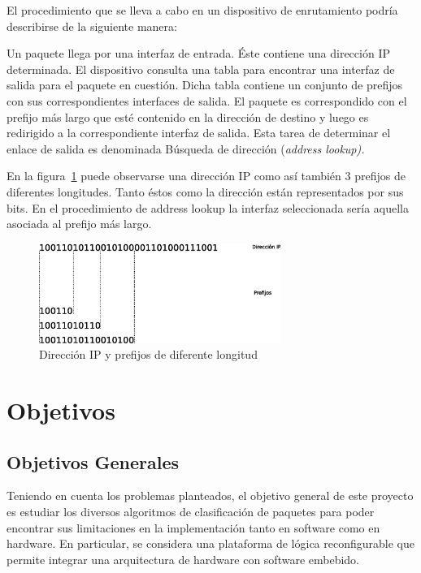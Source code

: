 El procedimiento que se lleva a cabo en un dispositivo de enrutamiento podría describirse de la siguiente manera:

Un paquete llega por una interfaz de entrada. Éste contiene una dirección IP determinada. El dispositivo consulta una tabla para encontrar una interfaz de salida para el paquete en cuestión. Dicha tabla contiene un conjunto de prefijos con sus correspondientes interfaces de salida. El paquete es correspondido con el prefijo más largo que esté contenido en la dirección de destino y luego es redirigido  a la correspondiente interfaz de salida. Esta tarea de determinar el enlace de salida es denominada Búsqueda de dirección (\textit{address lookup).}

En la figura~\ref{fig:prefijos} puede observarse una dirección IP como así también 3 prefijos de diferentes longitudes. Tanto éstos como la dirección están representados por sus bits. En el procedimiento de address lookup la interfaz seleccionada sería aquella asociada al prefijo más largo.

 \begin{figure}[h]
  \centering
	 \includegraphics[width=0.7\textwidth]{1-introduccion/graf/prefijos.eps}
  \caption{Dirección IP y prefijos de diferente longitud}
  \label{fig:prefijos}
\end{figure}



\section{Objetivos}
\subsection{Objetivos Generales}
Teniendo en cuenta los problemas planteados, el objetivo general de este proyecto es estudiar los diversos algoritmos de clasificación de paquetes para poder encontrar sus limitaciones en la implementación tanto en software como en hardware. 
En particular, se considera una plataforma de lógica reconfigurable que permite integrar una arquitectura de hardware con software embebido.

